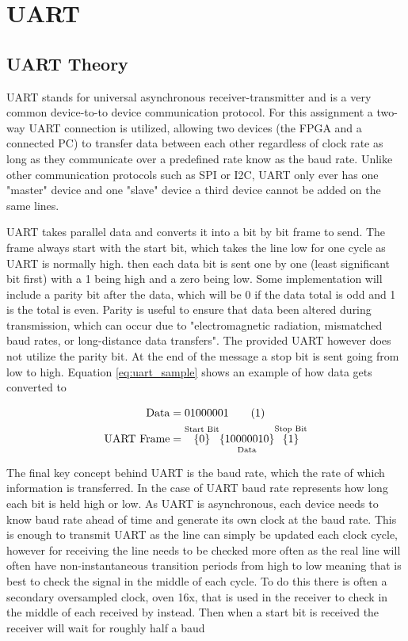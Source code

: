 \documentclass[11pt]{article}
\begin{document}
\section{UART}
\subsection{UART Theory}
UART stands for universal asynchronous receiver-transmitter and is a very common device-to-to device communication protocol\cite{UART}.
For this assignment a two-way UART connection is utilized,
allowing two devices (the FPGA and a connected PC) to transfer data between each other regardless of clock rate as long as they communicate over a predefined rate know as the baud rate.
Unlike other communication protocols such as SPI or I2C, UART only ever has one "master" device and one "slave" device a third device cannot be added on the same lines.

UART takes parallel data and converts it into a bit by bit frame to send.
The frame always start with the start bit, which takes the line low for one cycle as UART is normally high.
then each data bit is sent one by one (least significant bit first) with a 1 being high and a zero being low.
Some implementation will include a parity bit after the data, which will be 0 if the data total is odd and 1 is the total is even.
Parity is useful to ensure that data been altered during transmission, which can occur due to "electromagnetic radiation, mismatched baud rates, or long-distance data transfers"\cite{UART}.
The provided UART however does not utilize the parity bit.
At the end of the message a stop bit is sent going from low to high.
Equation \ref{eq:uart_sample} shows an example of how data gets converted to 

\begin{align*}
    \text{Data} &= 01000001
    \stepcounter{equation}\tag{\theequation}\label{eq:uart_sample} \\
    \text{UART Frame} &=    \overset{\text{Start Bit}}{\{0\}}
                            \underset{\text{Data}}{\{1000 0010\}}
                            \overset{\text{Stop Bit}}{\{1\}}\\
\end{align*}


The final key concept behind UART is the baud rate, which the rate of which information is transferred.
In the case of UART baud rate represents how long each bit is held high or low.
As UART is asynchronous, each device needs to know baud rate ahead of time and generate its own clock at the baud rate.
This is enough to transmit UART as the line can simply be updated each clock cycle,
however for receiving the line needs to be checked more often as the real line will often have non-instantaneous transition periods from high to low meaning that is best to check the signal in the middle of each cycle.
To do this there is often a secondary oversampled clock, oven 16x, that is used in the receiver to check in the middle of each received by instead.
Then when a start bit is received the receiver will wait for roughly half a baud
\end{document}
